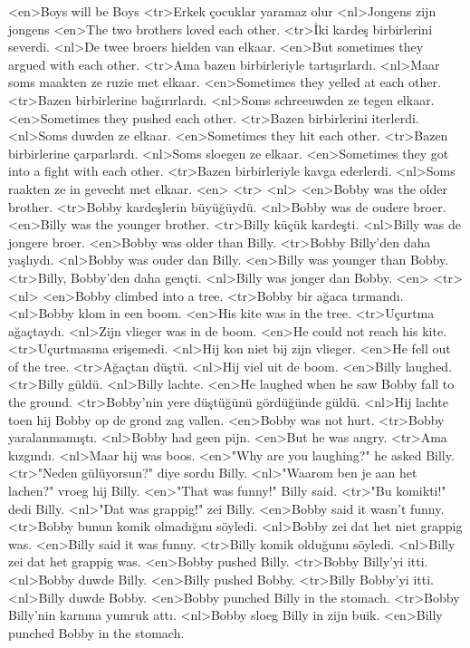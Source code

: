<en>Boys will be Boys
<tr>Erkek çocuklar yaramaz olur
<nl>Jongens zijn jongens
<en>The two brothers loved each other.
<tr>İki kardeş birbirlerini severdi.
<nl>De twee broers hielden van elkaar.
<en>But sometimes they argued with each other.
<tr>Ama bazen birbirleriyle tartışırlardı.
<nl>Maar soms maakten ze ruzie met elkaar.
<en>Sometimes they yelled at each other.
<tr>Bazen birbirlerine bağırırlardı.
<nl>Soms schreeuwden ze tegen elkaar.
<en>Sometimes they pushed each other.
<tr>Bazen birbirlerini iterlerdi.
<nl>Soms duwden ze elkaar.
<en>Sometimes they hit each other.
<tr>Bazen birbirlerine çarparlardı.
<nl>Soms sloegen ze elkaar.
<en>Sometimes they got into a fight with each other.
<tr>Bazen birbirleriyle kavga ederlerdi.
<nl>Soms raakten ze in gevecht met elkaar.
<en>
<tr>
<nl>
<en>Bobby was the older brother.
<tr>Bobby kardeşlerin büyüğüydü.
<nl>Bobby was de oudere broer.
<en>Billy was the younger brother.
<tr>Billy küçük kardeşti.
<nl>Billy was de jongere broer.
<en>Bobby was older than Billy.
<tr>Bobby Billy'den daha yaşlıydı.
<nl>Bobby was ouder dan Billy.
<en>Billy was younger than Bobby.
<tr>Billy, Bobby'den daha gençti.
<nl>Billy was jonger dan Bobby.
<en>
<tr>
<nl>
<en>Bobby climbed into a tree.
<tr>Bobby bir ağaca tırmandı.
<nl>Bobby klom in een boom.
<en>His kite was in the tree.
<tr>Uçurtma ağaçtaydı.
<nl>Zijn vlieger was in de boom.
<en>He could not reach his kite.
<tr>Uçurtmasına erişemedi.
<nl>Hij kon niet bij zijn vlieger.
<en>He fell out of the tree.
<tr>Ağaçtan düştü.
<nl>Hij viel uit de boom.
<en>Billy laughed.
<tr>Billy güldü.
<nl>Billy lachte.
<en>He laughed when he saw Bobby fall to the ground.
<tr>Bobby'nin yere düştüğünü gördüğünde güldü.
<nl>Hij lachte toen hij Bobby op de grond zag vallen.
<en>Bobby was not hurt.
<tr>Bobby yaralanmamıştı.
<nl>Bobby had geen pijn.
<en>But he was angry.
<tr>Ama kızgındı.
<nl>Maar hij was boos.
<en>"Why are you laughing?" he asked Billy.
<tr>"Neden gülüyorsun?" diye sordu Billy.
<nl>"Waarom ben je aan het lachen?" vroeg hij Billy.
<en>"That was funny!" Billy said.
<tr>"Bu komikti!" dedi Billy.
<nl>"Dat was grappig!" zei Billy.
<en>Bobby said it wasn't funny.
<tr>Bobby bunun komik olmadığını söyledi.
<nl>Bobby zei dat het niet grappig was.
<en>Billy said it was funny.
<tr>Billy komik olduğunu söyledi.
<nl>Billy zei dat het grappig was.
<en>Bobby pushed Billy.
<tr>Bobby Billy'yi itti.
<nl>Bobby duwde Billy.
<en>Billy pushed Bobby.
<tr>Billy Bobby'yi itti.
<nl>Billy duwde Bobby.
<en>Bobby punched Billy in the stomach.
<tr>Bobby Billy'nin karnına yumruk attı.
<nl>Bobby sloeg Billy in zijn buik.
<en>Billy punched Bobby in the stomach.
